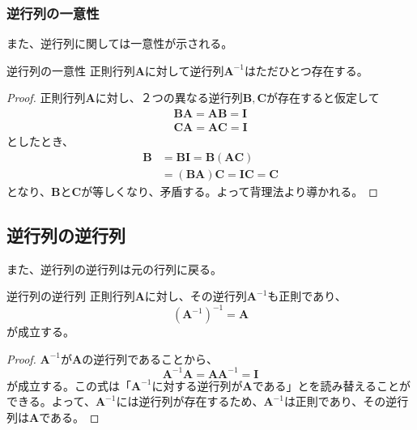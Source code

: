 \subsubsection{逆行列の一意性}
また、逆行列に関しては一意性が示される。
\begin{theorem*}{逆行列の一意性}
	正則行列\(\boldsymbol{A}\)に対して逆行列\(\boldsymbol{A}^{-1}\)はただひとつ存在する。
\end{theorem*}
\begin{proof}
	正則行列\(\boldsymbol{A}\)に対し、２つの異なる逆行列\(\boldsymbol{B},\boldsymbol{C}\)が存在すると仮定して
	\begin{equation}
		\begin{aligned}
			\boldsymbol{B}\boldsymbol{A}=\boldsymbol{A}\boldsymbol{B}=\boldsymbol{I} \\
			\boldsymbol{C}\boldsymbol{A}=\boldsymbol{A}\boldsymbol{C}=\boldsymbol{I}
		\end{aligned}
	\end{equation}
	としたとき、
	\begin{equation}
		\begin{aligned}
			\boldsymbol{B} & =\boldsymbol{B}\boldsymbol{I} =\boldsymbol{B}(\boldsymbol{A}\boldsymbol{C})               \\
			               & =(\boldsymbol{B}\boldsymbol{A})\boldsymbol{C}=\boldsymbol{I}\boldsymbol{C}=\boldsymbol{C}
		\end{aligned}
	\end{equation}
	となり、\(\boldsymbol{B}\)と\(\boldsymbol{C}\)が等しくなり、矛盾する。よって背理法より導かれる。
\end{proof}
\subsection{逆行列の逆行列}
また、逆行列の逆行列は元の行列に戻る。
\begin{theorem*}{逆行列の逆行列}
	正則行列\(\boldsymbol{A}\)に対し、その逆行列\(\boldsymbol{A}^{-1}\)も正則であり、
	\begin{equation}
		(\boldsymbol{A}^{-1})^{-1}=\boldsymbol{A}
	\end{equation}
	が成立する。
\end{theorem*}
\begin{proof}
	\(\boldsymbol{A}^{-1}\)が\(\boldsymbol{A}\)の逆行列であることから、
	\begin{equation}
		\boldsymbol{A}^{-1}\boldsymbol{A}=\boldsymbol{A}\boldsymbol{A}^{-1}=\boldsymbol{I}
	\end{equation}
	が成立する。この式は「\(\boldsymbol{A}^{-1}\)に対する逆行列が\(\boldsymbol{A}\)である」とを読み替えることができる。よって、\(\boldsymbol{A}^{-1}\)には逆行列が存在するため、\(\boldsymbol{A}^{-1}\)は正則であり、その逆行列は\(\boldsymbol{A}\)である。
\end{proof}
